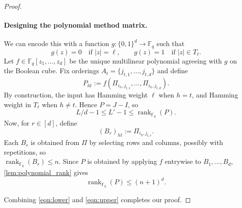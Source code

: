 \documentclass[10pt,a4paper]{amsart}
\begin{document}
\begin{proof}
\paragraph{Designing the polynomial method matrix.}  We can encode this with a function $g:\{0,1\}^d\to\mathbb F_q$ such that
\[
g(z)=0\quad\text{if }|z|=\ell,
\qquad
g(z)=1\quad\text{if }|z|\in T_\ell.
\] 
Let $f\in\mathbb F_q[z_1,\ldots,z_d]$ be the unique multilinear polynomial agreeing with $g$ on the Boolean cube. Fix orderings $A_t=\{j_{t,1},\ldots,j_{t,d}\}$ and define
\[
P_{ht}:=
f(\Pi_{i_h,j_{t,1}},\ldots,\Pi_{i_h,j_{t,d}}).
\]
By construction, the input has Hamming weight $\ell$ when $h=t$, and
Hamming weight in $T_\ell$ when $h\ne t$. Hence $P=J-I$, so
\begin{equation} \label{eqn:lower}
L/d - 1\leq L'-1\le \operatorname{rank}_{\mathbb F_q}(P).
\end{equation}
Now, for $r\in[d]$, define
\[
(B_r)_{ht}:=\Pi_{i_h,j_{t,r}}.
\]
Each $B_r$ is obtained from $\Pi$ by selecting rows and columns, possibly with
repetitions, so \\ $\operatorname{rank}_{\mathbb F_q}(B_r)\le n$. Since $P$ is
obtained by applying $f$ entrywise to $B_1,\ldots,B_d$, \cref{lem:polynomial_rank}
gives
\begin{equation} \label{eqn:upper}
\operatorname{rank}_{\mathbb F_q}(P)\le (n+1)^d.
\end{equation}

Combining \cref{eqn:lower} and \cref{eqn:upper} completes our proof.
\end{proof}
\end{document}
